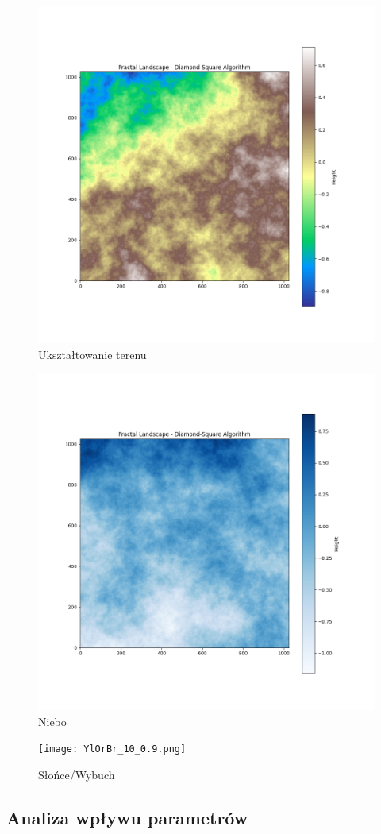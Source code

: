 \documentclass{article}
\begin{document}
\begin{figure}[H]
    \centering
    \includegraphics[width=0.7\linewidth]{terrain_10_0.65.png}
    \caption{Ukształtowanie terenu}
\end{figure}

\begin{figure}[H]
    \centering
    \includegraphics[width=0.7\linewidth]{Blues_10_0.7.png}
    \caption{Niebo}
\end{figure}

\begin{figure}[H]
    \centering
    \texttt{[image: YlOrBr\_10\_0.9.png]}
    \caption{Słońce/Wybuch}
\end{figure}
\newpage
\subsection*{Analiza wpływu parametrów}
\end{document}
